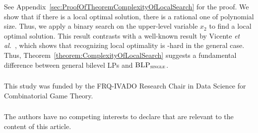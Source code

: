 \documentclass[runningheads,orivec]{llncs}
\newif\ifIPCOFlag
\newcommand{\IPCO}[2]{\ifIPCOFlag#1\else#2\fi}
\newcommand{\EtAl}{\textit{et al.}}
\newcommand{\MacroColor}[1]{#1}
\newcommand{\ComplexityClassStyle}[1]{#1}
\newcommand{\ClassNP}{\MacroColor{\text{\ComplexityClassStyle{NP}}}}
\newcommand{\BLPWithSingleUpperLevelVariable}{\MacroColor{$\textsc{BLP}_{\textsc{single}}$}}
\begin{document}
See \IPCO{the full version of the paper~\cite{sugishita2025complexitybilevellinearprogramming}}{Appendix~\ref{sec:ProofOfTheoremComplexityOfLocalSearch}} for the proof.
We show that if there is a local optimal solution, there is a rational one of polynomial size.
Thus, we apply a binary search on the upper-level variable $x_2$ to find a local optimal solution.
This result contrasts with a well-known result by Vicente \EtAl{}~\cite{vicente1994descent}, which shows that recognizing local optimality is \ClassNP{}-hard in the general case.
Thus, Theorem~\ref{theorem:ComplexityOfLocalSearch} suggests a fundamental difference between general bilevel LPs and \BLPWithSingleUpperLevelVariable{}.

\begin{credits}
\subsubsection{\ackname} 
This study was funded by the FRQ-IVADO Research Chair in Data Science for Combinatorial Game Theory.

\subsubsection{\discintname}
The authors have no competing interests to declare that are
relevant to the content of this article.
\end{credits}
%
%
%



\ifIPCOFlag
\else
\clearpage
\end{document}
